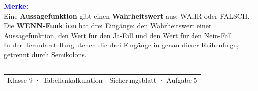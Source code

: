 \documentclass[11pt,a4paper]{article}
\makeatletter
\newcommand{\footerline}{%
  {\color{Line}\rule{\linewidth}{0.5pt}}\par
  \vspace{1.5mm}
  \begin{tabularx}{\linewidth}{@{}Xr@{}}
    {\small\color{Muted}Klasse 9 · Tabellenkalkulation} &
    {\small\color{Muted}Sicherungsblatt · Aufgabe 5}
  \end{tabularx}%
}
\makeatother
\begin{document}
\vspace{7mm}
\colorbox{Mint}{%
  \parbox{\dimexpr\linewidth-2\fboxsep\relax}{%
    \vspace{2.4mm}
    \textcolor{Blue}{\bfseries Merke:}\\[2.4mm]
    Eine \textbf{Aussagefunktion} gibt einen \textbf{Wahrheitswert} aus: WAHR
    oder FALSCH.\\[2.4mm]
    Die \textbf{WENN-Funktion} hat drei Eingänge: den Wahrheitswert einer
    Aussagefunktion, den Wert für den Ja-Fall und den Wert für den
    Nein-Fall.\\[2.4mm]
    In der Termdarstellung stehen die drei Eingänge in genau dieser
    Reihenfolge, getrennt durch Semikolons.
    \vspace{2.4mm}
  }%
}

\vfill
\footerline
\end{document}
